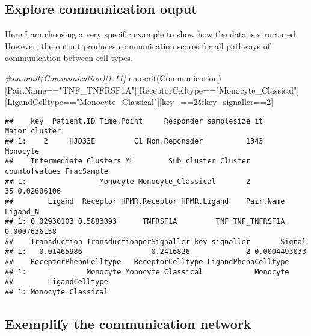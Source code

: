 \documentclass[
]{article}
\newenvironment{Shaded}{\begin{snugshade}}{\end{snugshade}}
\newcommand{\CommentTok}[1]{\textcolor[rgb]{0.56,0.35,0.01}{\textit{#1}}}
\newcommand{\DecValTok}[1]{\textcolor[rgb]{0.00,0.00,0.81}{#1}}
\newcommand{\FunctionTok}[1]{\textcolor[rgb]{0.00,0.00,0.00}{#1}}
\newcommand{\NormalTok}[1]{#1}
\newcommand{\SpecialCharTok}[1]{\textcolor[rgb]{0.00,0.00,0.00}{#1}}
\newcommand{\StringTok}[1]{\textcolor[rgb]{0.31,0.60,0.02}{#1}}
\begin{document}
\hypertarget{explore-communication-ouput}{%
\subsection{Explore communication
ouput}\label{explore-communication-ouput}}

Here I am choosing a very specific example to show how the data is
structured. However, the output produces communication scores for all
pathways of communication between cell types.

\begin{Shaded}
\begin{Highlighting}[]
\CommentTok{\#na.omit(Communication)[1:11]}
\FunctionTok{na.omit}\NormalTok{(Communication)[Pair.Name}\SpecialCharTok{==}\StringTok{"TNF\_TNFRSF1A"}\NormalTok{][ReceptorCelltype}\SpecialCharTok{==}\StringTok{"Monocyte\_Classical"}\NormalTok{][LigandCelltype}\SpecialCharTok{==}\StringTok{"Monocyte\_Classical"}\NormalTok{][key\_}\SpecialCharTok{==}\DecValTok{2}\SpecialCharTok{\&}\NormalTok{key\_signaller}\SpecialCharTok{==}\DecValTok{2}\NormalTok{]}
\end{Highlighting}
\end{Shaded}

\begin{verbatim}
##    key_ Patient.ID Time.Point     Responder samplesize_it Major_cluster
## 1:    2     HJD33E         C1 Non.Reponsder          1343      Monocyte
##    Intermediate_Clusters_ML        Sub_cluster Cluster countofvalues FracSample
## 1:                 Monocyte Monocyte_Classical       2            35 0.02606106
##        Ligand  Receptor HPMR.Receptor HPMR.Ligand    Pair.Name     Ligand_N
## 1: 0.02930103 0.5883893      TNFRSF1A         TNF TNF_TNFRSF1A 0.0007636158
##    Transduction TransductionperSignaller key_signaller       Signal
## 1:   0.01465986                0.2416826             2 0.0004493033
##    ReceptorPhenoCelltype   ReceptorCelltype LigandPhenoCelltype
## 1:              Monocyte Monocyte_Classical            Monocyte
##        LigandCelltype
## 1: Monocyte_Classical
\end{verbatim}

\hypertarget{exemplify-the-communication-network}{%
\subsection{Exemplify the communication
network}\label{exemplify-the-communication-network}}
\end{document}
